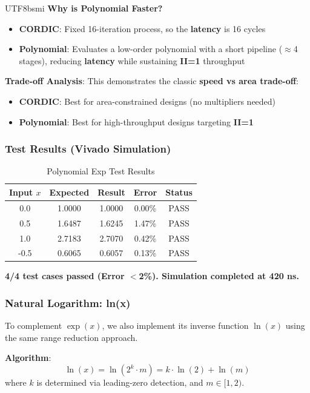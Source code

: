 \documentclass[journal,twoside]{IEEEtran}
\begin{document}
\begin{CJK}{UTF8}{bsmi}
\textbf{Why is Polynomial Faster?}
\begin{itemize}
    \item \textbf{CORDIC}: Fixed 16-iteration process, so the \textbf{latency} is 16 cycles
    \item \textbf{Polynomial}: Evaluates a low-order polynomial with a short pipeline ($\approx$4 stages), reducing \textbf{latency} while sustaining \textbf{II=1} throughput
\end{itemize}

\textbf{Trade-off Analysis}: This demonstrates the classic \textbf{speed vs area trade-off}:
\begin{itemize}
    \item \textbf{CORDIC}: Best for area-constrained designs (no multipliers needed)
    \item \textbf{Polynomial}: Best for high-throughput designs targeting \textbf{II=1}
\end{itemize}

\subsubsection{Test Results (Vivado Simulation)}
\begin{table}[!t]
\centering
\caption{Polynomial Exp Test Results}
\footnotesize
\begin{tabular}{@{}ccccc@{}}
\toprule
\textbf{Input $x$} & \textbf{Expected} & \textbf{Result} & \textbf{Error} & \textbf{Status} \\
\midrule
0.0 & 1.0000 & 1.0000 & 0.00\% & PASS \\
0.5 & 1.6487 & 1.6245 & 1.47\% & PASS \\
1.0 & 2.7183 & 2.7070 & 0.42\% & PASS \\
-0.5 & 0.6065 & 0.6057 & 0.13\% & PASS \\
\bottomrule
\end{tabular}
\end{table}

\textbf{4/4 test cases passed (Error $<$2\%). Simulation completed at 420 ns.}

\subsubsection{Natural Logarithm: ln(x)}
To complement $\exp(x)$, we also implement its inverse function $\ln(x)$ using the same range reduction approach.

\textbf{Algorithm}:
\begin{equation}
\ln(x) = \ln(2^k \cdot m) = k \cdot \ln(2) + \ln(m)
\end{equation}
where $k$ is determined via leading-zero detection, and $m \in [1, 2)$.


\end{CJK}
\end{document}
